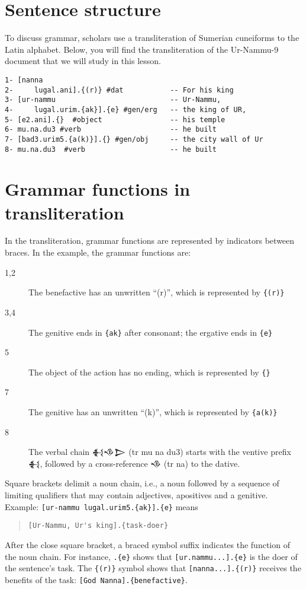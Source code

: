 \documentclass[a4paper,12pt]{book}
\newcommand{\fcn}{\setmainfont{Akkadian.otf}}
\begin{document}
\section{Sentence structure}
To discuss grammar, scholars use a transliteration
of Sumerian cuneiforms to the Latin alphabet.
Below, you will find the transliteration of
the Ur-Nammu-9 document that we will study
in this lesson.
\begin{verbatim}
1- [nanna
2-     lugal.ani].{(r)} #dat           -- For his king
3- [ur-nammu                           -- Ur-Nammu,
4-     lugal.urim.{ak}].{e} #gen/erg   -- the king of UR,
5- [e2.ani].{}  #object                -- his temple
6- mu.na.du3 #verb                     -- he built
7- [bad3.urim5.{a(k)}].{} #gen/obj     -- the city wall of Ur
8- mu.na.du3  #verb                    -- he built
\end{verbatim}

\section{Grammar functions in transliteration}

In the transliteration, grammar functions are
represented by indicators between braces.
In the example, the grammar functions are:
\begin{description}
\item[1,2] The benefactive has an unwritten ``(r)'',
  which is represented by \verb|{(r)}|
\item[3,4] The genitive ends in \verb|{ak}| after
  consonant; the ergative ends in \verb|{e}|
\item[5] The object of the action has no ending,
  which is represented by \verb|{}|
\item[7] The genitive has an unwritten ``(k)'',
  which is represented by \verb|{a(k)}|
\item[8] The verbal chain {\fcn 𒈬𒈾𒆕} (tr mu na du3)
  starts with the ventive prefix {\fcn 𒈬},
  followed by a cross-reference {\fcn 𒈾} (tr na)
  to the dative.
\end{description}

Square brackets delimit a noun chain, i.e.,
a noun followed by a sequence of limiting
qualifiers that may contain adjectives,
apositives and a genitive.
Example: \verb|[ur-nammu lugal.urim5.{ak}].{e}|
means
\begin{quote}
\begin{verbatim}
[Ur-Nammu, Ur's king].{task-doer}
\end{verbatim}
\end{quote}
After the close square bracket, a braced symbol
suffix indicates the function of the noun chain.
For instance, \verb|.{e}| shows that
\verb|[ur.nammu...].{e}| is the doer of
the sentence's task. The \verb|{(r)}| symbol
shows that \verb|[nanna...].{(r)}| receives
the benefits of the task:
\verb|[God Nanna].{benefactive}|.
\end{document}
